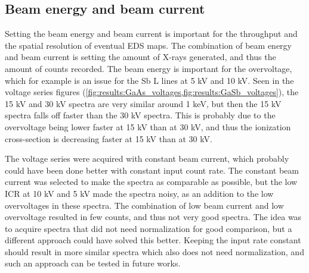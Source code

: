 \subsection{Beam energy and beam current}
\label{discussion:beam_energy_current}

Setting the beam energy and beam current is important for the throughput and the spatial resolution of eventual EDS maps.
The combination of beam energy and beam current is setting the amount of X-rays generated, and thus the amount of counts recorded.
The beam energy is important for the overvoltage, which for example is an issue for the Sb L lines at 5 kV and 10 kV. 
Seen in the voltage series figures (\cref{fig:results:GaAs_voltages,fig:results:GaSb_voltages}), the 15 kV and 30 kV spectra are very similar around 1 keV, but then the 15 kV spectra falls off faster than the 30 kV spectra.
This is probably due to the overvoltage being lower faster at 15 kV than at 30 kV, and thus the ionization cross-section is decreasing faster at 15 kV than at 30 kV.

The voltage series were acquired with constant beam current, which probably could have been done better with constant input count rate.
The constant beam current was selected to make the spectra as comparable as possible, but the low ICR at 10 kV and 5 kV made the spectra noisy, as an addition to the low overvoltages in these spectra. 
The combination of low beam current and low overvoltage resulted in few counts, and thus not very good spectra.
The idea was to acquire spectra that did not need normalization for good comparison, but a different approach could have solved this better.
Keeping the input rate constant should result in more similar spectra which also does not need normalization, and such an approach can be tested in future works.


